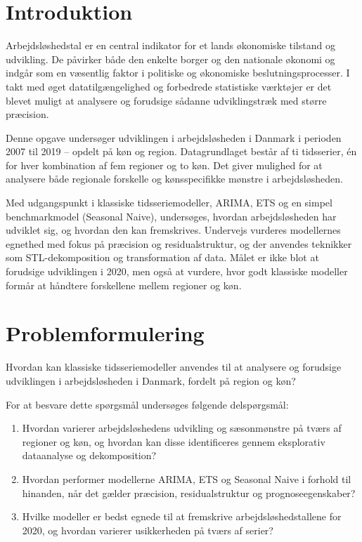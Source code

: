\documentclass[
]{article}
\begin{document}
\section{Introduktion}\label{introduktion}

Arbejdsløshedstal er en central indikator for et lands økonomiske
tilstand og udvikling. De påvirker både den enkelte borger og den
nationale økonomi og indgår som en væsentlig faktor i politiske og
økonomiske beslutningsprocesser. I takt med øget datatilgængelighed og
forbedrede statistiske værktøjer er det blevet muligt at analysere og
forudsige sådanne udviklingstræk med større præcision.

Denne opgave undersøger udviklingen i arbejdsløsheden i Danmark i
perioden 2007 til 2019 -- opdelt på køn og region. Datagrundlaget består
af ti tidsserier, én for hver kombination af fem regioner og to køn. Det
giver mulighed for at analysere både regionale forskelle og
kønsspecifikke mønstre i arbejdsløsheden.

Med udgangspunkt i klassiske tidsseriemodeller, ARIMA, ETS og en simpel
benchmarkmodel (Seasonal Naive), undersøges, hvordan arbejdsløsheden har
udviklet sig, og hvordan den kan fremskrives. Undervejs vurderes
modellernes egnethed med fokus på præcision og residualstruktur, og der
anvendes teknikker som STL-dekomposition og transformation af data.
Målet er ikke blot at forudsige udviklingen i 2020, men også at vurdere,
hvor godt klassiske modeller formår at håndtere forskellene mellem
regioner og køn.

\section{Problemformulering}\label{problemformulering}

Hvordan kan klassiske tidsseriemodeller anvendes til at analysere og
forudsige udviklingen i arbejdsløsheden i Danmark, fordelt på region og
køn?

For at besvare dette spørgsmål undersøges følgende delspørgsmål:

\begin{enumerate}
\def\labelenumi{\arabic{enumi}.}
\item
  Hvordan varierer arbejdsløshedens udvikling og sæsonmønstre på tværs
  af regioner og køn, og hvordan kan disse identificeres gennem
  eksplorativ dataanalyse og dekomposition?
\item
  Hvordan performer modellerne ARIMA, ETS og Seasonal Naive i forhold
  til hinanden, når det gælder præcision, residualstruktur og
  prognoseegenskaber?
\item
  Hvilke modeller er bedst egnede til at fremskrive
  arbejdsløshedstallene for 2020, og hvordan varierer usikkerheden på
  tværs af serier?
\end{enumerate}
\end{document}
